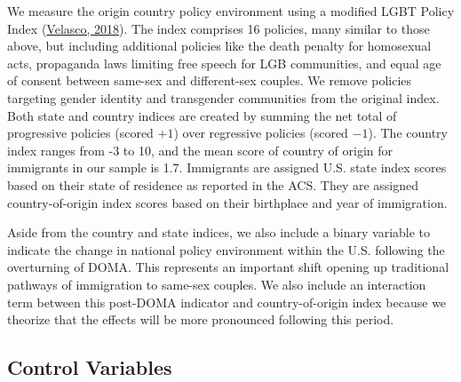 \documentclass[
  12pt,
]{article}
\begin{document}
We measure the origin country policy environment using a modified LGBT Policy Index (\protect\hyperlink{ref-velasco_2018}{Velasco, 2018}). The index comprises 16 policies, many similar to those above, but including additional policies like the death penalty for homosexual acts, propaganda laws limiting free speech for LGB communities, and equal age of consent between same-sex and different-sex couples. We remove policies targeting gender identity and transgender communities from the original index. Both state and country indices are created by summing the net total of progressive policies (scored \(+1\)) over regressive policies (scored \(-1\)). The country index ranges from -3 to 10, and the mean score of country of origin for immigrants in our sample is 1.7. Immigrants are assigned U.S. state index scores based on their state of residence as reported in the ACS. They are assigned country-of-origin index scores based on their birthplace and year of immigration.

Aside from the country and state indices, we also include a binary variable to indicate the change in national policy environment within the U.S. following the overturning of DOMA. This represents an important shift opening up traditional pathways of immigration to same-sex couples. We also include an interaction term between this post-DOMA indicator and country-of-origin index because we theorize that the effects will be more pronounced following this period.

\hypertarget{control-variables}{%
\subsection{Control Variables}\label{control-variables}}
\end{document}

